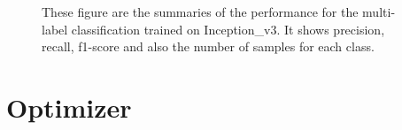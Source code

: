 \begin{figure}
\caption [Performance summary of the Components class trained on Inception\_v3]{These figure are the summaries of the performance for the multi-label classification trained on Inception\_v3. It shows precision, recall, f1-score and also the number of samples for each class.}
\label{fig:perf_goog}
\end{figure}

\section{Optimizer}\label{sec:opt}
